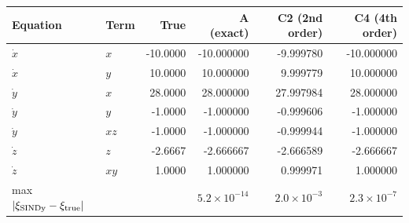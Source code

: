 \begin{tabular}{llrrrr}\toprule Equation & Term & True & A (exact) & C2 (2nd order) & C4 (4th order)\\\midrule
$\dot x$ & $x$ & -10.0000 & -10.000000 & -9.999780 & -10.000000\\
$\dot x$ & $y$ & 10.0000 & 10.000000 & 9.999779 & 10.000000\\
$\dot y$ & $x$ & 28.0000 & 28.000000 & 27.997984 & 28.000000\\
$\dot y$ & $y$ & -1.0000 & -1.000000 & -0.999606 & -1.000000\\
$\dot y$ & $xz$ & -1.0000 & -1.000000 & -0.999944 & -1.000000\\
$\dot z$ & $z$ & -2.6667 & -2.666667 & -2.666589 & -2.666667\\
$\dot z$ & $xy$ & 1.0000 & 1.000000 & 0.999971 & 1.000000\\
\midrule max $|\xi_{\rm SINDy}-\xi_{\rm true}|$ & & & $5.2\!\times\!10^{-14}$ & $2.0\!\times\!10^{-3}$ & $2.3\!\times\!10^{-7}$\\
\bottomrule\end{tabular}